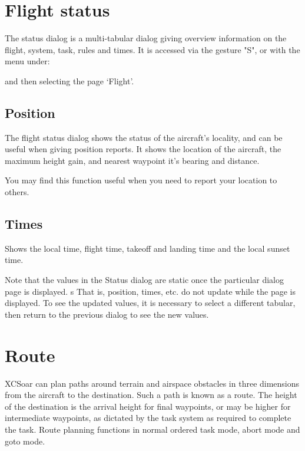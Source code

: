 \section{Flight status}\label{sec:flight-status}

The status dialog is a multi-tabular dialog giving overview information on the 
flight, system, task, rules and times.
It is accessed via the gesture "S", or with the menu under: 
\begin{quote}
\blink{}
\end{quote}
and then selecting the page `Flight'. 

\subsection*{Position}
The flight status dialog shows the status of the aircraft's locality, and can 
be useful when giving position reports. It shows the location of the aircraft, the
maximum height gain, and nearest waypoint it's bearing and distance.

You may find this function useful when you need to report your
location to others.

\subsection*{Times}
Shows the local time, flight time, takeoff and landing time and
the local sunset time.

Note that the values in the Status dialog 
are static once the particular dialog page is displayed. 
s
That is, position, times, etc. do not update while the page is displayed. 
To see the updated values, it is necessary to select a different tabular, 
then return to the previous dialog to see the new values.

\section{Route}\label{sec:route}

XCSoar can plan paths around terrain and airspace obstacles in three
dimensions from the aircraft to the destination.  Such a path is known
as a route.  The height of the destination is the arrival height for
final waypoints, or may be higher for intermediate waypoints, as
dictated by the task system as required to complete the task.  Route
planning functions in normal ordered task mode, abort mode and goto
mode.


